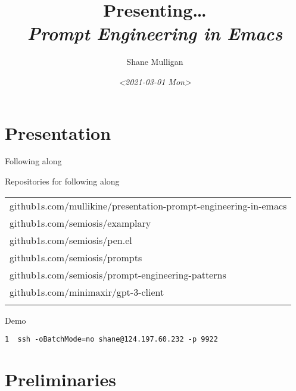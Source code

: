 \documentclass[presentation]{beamer}
\author{Shane Mulligan \\  }
\date{\textit{<2021-03-01 Mon>}}
\title{Presenting\ldots{} \\   \emph{\alert{Prompt Engineering in Emacs}} \\  }
\begin{document}
\maketitle

\section{Presentation}
\label{sec:org0abac80}
\begin{frame}[label={sec:org876e5c4},fragile]{Following along}
 \begin{block}{Repositories for following along}
{\footnotesize
\begin{center}
\begin{tabular}{l}
github1s.com/mullikine/presentation-prompt-engineering-in-emacs\\
github1s.com/semiosis/examplary\\
github1s.com/semiosis/pen.el\\
github1s.com/semiosis/prompts\\
github1s.com/semiosis/prompt-engineering-patterns\\
github1s.com/minimaxir/gpt-3-client\\
\\
\end{tabular}
\end{center}
}
\end{block}

\begin{block}{Demo}
{\footnotesize
\begin{verbatim}
1  ssh -oBatchMode=no shane@124.197.60.232 -p 9922
\end{verbatim}
}
\end{block}
\end{frame}

\section{Preliminaries}
\label{sec:org3db2532}
\end{document}
